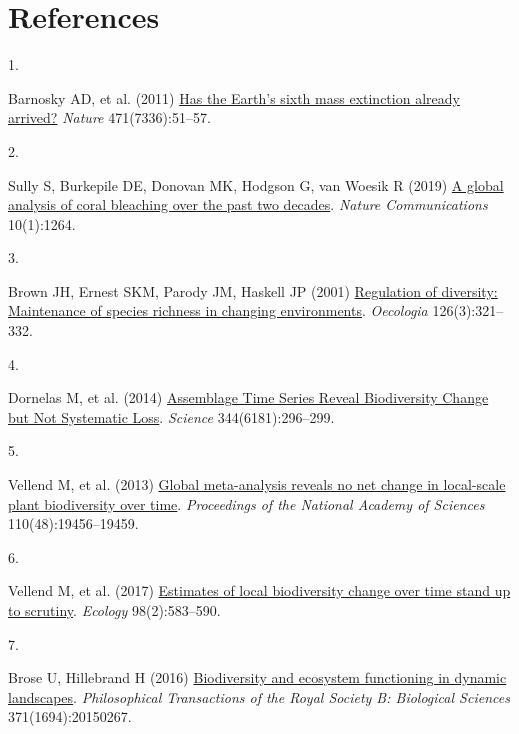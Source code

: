 \documentclass{article}
\newlength{\cslhangindent}
\newlength{\csllabelwidth}
\newlength{\cslentryspacingunit} %
\newenvironment{CSLReferences}[2] %
 {%
  \setlength{\parindent}{0pt}
  \ifodd #1
  \let\oldpar\par
  \def\par{\hangindent=\cslhangindent\oldpar}
  \fi
  \setlength{\parskip}{#2\cslentryspacingunit}
 }%
 {}
\newcommand{\CSLLeftMargin}[1]{\parbox[t]{\csllabelwidth}{#1}}
\newcommand{\CSLRightInline}[1]{\parbox[t]{\linewidth - \csllabelwidth}{#1}\break}
\begin{document}
\hypertarget{references}{%
\section*{References}\label{references}}

\hypertarget{refs}{}
\begin{CSLReferences}{0}{0}
\leavevmode{}%
\CSLLeftMargin{1. }%
\CSLRightInline{Barnosky AD, et al. (2011)
\href{https://doi.org/10.1038/nature09678}{Has the Earth{'}s sixth mass
extinction already arrived?} \emph{Nature} 471(7336):51--57.}

\leavevmode{}%
\CSLLeftMargin{2. }%
\CSLRightInline{Sully S, Burkepile DE, Donovan MK, Hodgson G, van Woesik
R (2019) \href{https://doi.org/10.1038/s41467-019-09238-2}{A global
analysis of coral bleaching over the past two decades}. \emph{Nature
Communications} 10(1):1264.}

\leavevmode{}%
\CSLLeftMargin{3. }%
\CSLRightInline{Brown JH, Ernest SKM, Parody JM, Haskell JP (2001)
\href{http://www.jstor.org/stable/4222853}{Regulation of diversity:
Maintenance of species richness in changing environments}.
\emph{Oecologia} 126(3):321--332.}

\leavevmode{}%
\CSLLeftMargin{4. }%
\CSLRightInline{Dornelas M, et al. (2014)
\href{https://doi.org/10.1126/science.1248484}{Assemblage Time Series
Reveal Biodiversity Change but Not Systematic Loss}. \emph{Science}
344(6181):296--299.}

\leavevmode{}%
\CSLLeftMargin{5. }%
\CSLRightInline{Vellend M, et al. (2013)
\href{https://doi.org/10.1073/pnas.1312779110}{Global meta-analysis
reveals no net change in local-scale plant biodiversity over time}.
\emph{Proceedings of the National Academy of Sciences}
110(48):19456--19459.}

\leavevmode{}%
\CSLLeftMargin{6. }%
\CSLRightInline{Vellend M, et al. (2017)
\href{https://doi.org/10.1002/ecy.1660}{Estimates of local biodiversity
change over time stand up to scrutiny}. \emph{Ecology} 98(2):583--590.}

\leavevmode{}%
\CSLLeftMargin{7. }%
\CSLRightInline{Brose U, Hillebrand H (2016)
\href{https://doi.org/10.1098/rstb.2015.0267}{Biodiversity and ecosystem
functioning in dynamic landscapes}. \emph{Philosophical Transactions of
the Royal Society B: Biological Sciences} 371(1694):20150267.}


\end{CSLReferences}
\end{document}
